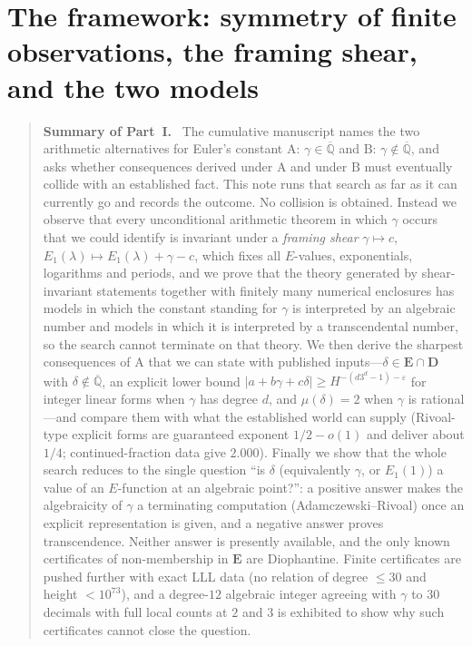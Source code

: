 \documentclass[11pt,a4paper]{article}
\newcommand{\Qbar}{\overline{\mathbb Q}}
\newcommand{\EE}{\mathbf E}
\newcommand{\DD}{\mathbf D}
\theoremstyle{definition}
\theoremstyle{remark}
\numberwithin{equation}{section}
\newenvironment{partsummary}[1]{\begin{quotation}\small\noindent\textbf{Summary of Part~#1.}\ }{\end{quotation}}
\begin{document}
\part{The framework: symmetry of finite observations, the framing shear, and the two models}
\begin{partsummary}{I}
The cumulative manuscript names the two arithmetic alternatives for Euler's constant
$\mathrm A$: $\gamma\in\Qbar$ and $\mathrm B$: $\gamma\notin\Qbar$, and asks whether
consequences derived under $\mathrm A$ and under $\mathrm B$ must eventually collide
with an established fact. This note runs that search as far as it can currently go and
records the outcome. No collision is obtained. Instead we observe that every
unconditional arithmetic theorem in which $\gamma$ occurs that we could identify is
invariant under a \emph{framing shear} $\gamma\mapsto c$,
$E_1(\lambda)\mapsto E_1(\lambda)+\gamma-c$, which fixes all $E$-values, exponentials,
logarithms and periods, and we prove that the theory generated by shear-invariant
statements together with finitely many numerical enclosures has models in which the
constant standing for $\gamma$ is interpreted by an algebraic number and models in which
it is interpreted by a transcendental number, so the search cannot terminate on that
theory. We then derive the sharpest consequences of $\mathrm A$ that we
can state with published inputs---$\delta\in\EE\cap\DD$ with $\delta\notin\Qbar$, an
explicit lower bound $|a+b\gamma+c\delta|\ge H^{-(d3^d-1)-\varepsilon}$ for integer
linear forms when $\gamma$ has degree $d$, and $\mu(\delta)=2$ when $\gamma$ is rational---and
compare them with what the established world can supply (Rivoal-type explicit forms are
guaranteed exponent $1/2-o(1)$ and deliver about $1/4$; continued-fraction data give
$2.000$). Finally we show that
the whole search reduces to the single question ``is $\delta$ (equivalently $\gamma$, or
$E_1(1)$) a value of an $E$-function at an algebraic point?'': a positive answer makes the
algebraicity of $\gamma$ a terminating computation (Adamczewski--Rivoal) once an explicit
representation is given, and a
negative answer proves transcendence. Neither answer is presently available, and the only
known certificates of non-membership in $\EE$ are Diophantine. Finite certificates are
pushed further with exact LLL data (no relation of degree $\le30$ and height
$<10^{73}$), and a degree-$12$ algebraic integer agreeing with $\gamma$ to $30$ decimals with
full local counts at $2$ and $3$ is exhibited to show why such certificates cannot close the
question.
\end{partsummary}
\end{document}

